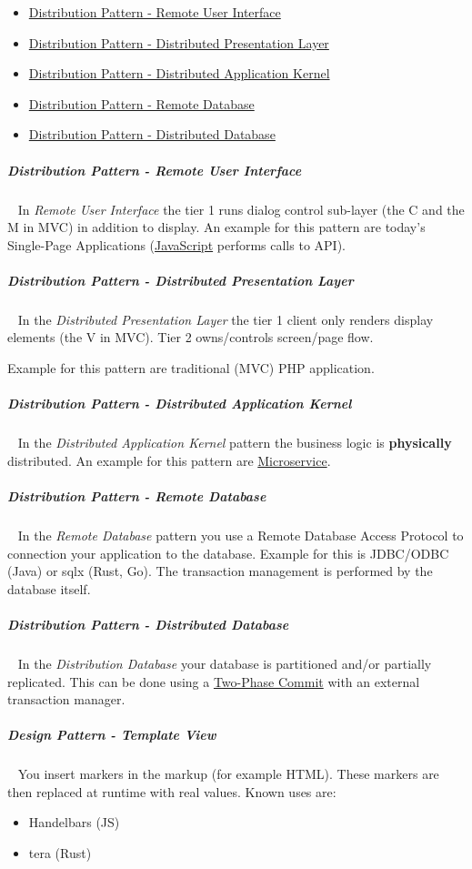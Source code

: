 \documentclass[11pt,twoside,landscape]{article}
\begin{document}
\begin{multicols}{3}
\begin{itemize}
\item \href{../../../roam/20230107150231-distribution_pattern_remote_user_interface.org}{Distribution Pattern - Remote User Interface}
\item \href{../../../roam/20230107150503-distribution_pattern_distributed_presentation_layer.org}{Distribution Pattern - Distributed Presentation Layer}
\item \href{../../../roam/20230107150808-distribution_pattern_distributed_application_kernel.org}{Distribution Pattern - Distributed Application Kernel}
\item \href{../../../roam/20230107151100-distribution_pattern_remote_database.org}{Distribution Pattern - Remote Database}
\item \href{../../../roam/20230107151436-distribution_pattern_distributed_database.org}{Distribution Pattern - Distributed Database}
\end{itemize}
\subparagraph{Distribution Pattern - Remote User Interface} \
\label{sec:org25900a3}
In \emph{Remote User Interface} the tier 1 runs dialog control sub-layer (the C and the M in MVC) in addition to display.
An example for this pattern are today's Single-Page Applications (\href{../../../roam/20220513105545-javascript.org}{JavaScript} performs calls to API).
\subparagraph{Distribution Pattern - Distributed Presentation Layer} \
\label{sec:org41cb372}
In the \emph{Distributed Presentation Layer} the tier 1 client only renders display elements (the V in MVC).
Tier 2 owns/controls screen/page flow.

Example for this pattern are traditional (MVC) PHP application.
\subparagraph{Distribution Pattern - Distributed Application Kernel} \
\label{sec:org2656a87}
In the \emph{Distributed Application Kernel} pattern the business logic is \textbf{physically} distributed.
An example for this pattern are \href{../../../roam/20230107150950-what_are_microservices.org}{Microservice}.
\subparagraph{Distribution Pattern - Remote Database} \
\label{sec:org2ba1310}
In the \emph{Remote Database} pattern you use a Remote Database Access Protocol to connection your application to the database.
Example for this is JDBC/ODBC (Java) or sqlx (Rust, Go).
The transaction management is performed by the database itself.
\subparagraph{Distribution Pattern - Distributed Database} \
\label{sec:org3b5c399}
In the \emph{Distribution Database} your database is partitioned and/or partially replicated.
This can be done using a \href{../../../roam/20230107151606-what_is_a_two_phase_commit.org}{Two-Phase Commit} with an external transaction manager.
\subparagraph{Design Pattern - Template View} \
\label{sec:org32bd2f1}
You insert markers in the markup (for example HTML).
These markers are then replaced at runtime with real values.
Known uses are:
\begin{itemize}
\item Handelbars (JS)
\item tera (Rust)
\end{itemize}


\end{multicols}
\end{document}
